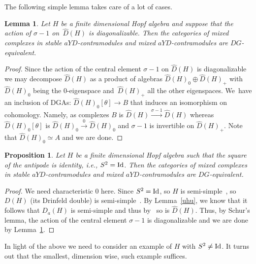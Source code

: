 \documentclass[pdftex]{sigma}
\numberwithin{equation}{section}
\newtheorem{Lemma}[Theorem]{Lemma}
\newtheorem{Proposition}[Theorem]{Proposition}
\begin{document}
The following simple lemma takes care of a lot of cases.

\begin{Lemma}\label{diag}
Let $H$ be a finite dimensional Hopf algebra and suppose that the action of $\sigma-1$ on~$\widehat{D}(H)$ is diagonalizable. Then the categories of mixed complexes in stable $aYD$-contramodules and mixed $aYD$-contramodules are $DG$-equivalent.
\end{Lemma}

\begin{proof}
Since the action of the central element $\sigma-1$ on $\widehat{D}(H)$ is diagonalizable we may decom\-pose $\widehat{D}(H)$ as a product of algebras $\widehat{D}(H)_0\oplus \widehat{D}(H)_+$ with $\widehat{D}(H)_0$ being the $0$-eigenspace and~$\widehat{D}(H)_+$ all the other eigenspaces. We~have an inclusion of DGAs: $\widehat{D}(H)_0[\theta]\to B$ that induces an isomorphism on cohomology. Namely, as complexes $B$ is $\widehat{D}(H)\stackrel{\sigma-1}{\to}\widehat{D}(H)$ whereas $\widehat{D}(H)_0[\theta]$ is $\widehat{D}(H)_0\stackrel{0}{\to}\widehat{D}(H)_0$ and $\sigma-1$ is invertible on $\widehat{D}(H)_+$. Note that $\widehat{D}(H)_0\simeq A$ and we are done.
\end{proof}

\begin{Proposition}\label{sscase}
Let $H$ be a finite dimensional Hopf algebra such that the square of the antipode is identity, i.e., $S^2={\rm Id}$. Then the categories of mixed complexes in stable $aYD$-contramodules and mixed $aYD$-contramodules are $DG$-equivalent.
\end{Proposition}

\begin{proof}We need characteristic $0$ here. Since $S^2={\rm Id}$, so $H$ is semi-simple~\cite{sqid2, sqid}, so $D(H)$ (its Drinfeld double) is semi-simple~\cite{dhss}. By Lemma~\ref{uhu}, we know that it follows that $D_a(H)$ is semi-simple and thus by~\cite{s2} so is $\widehat{D}(H)$. Thus, by Schur's lemma, the action of the central element $\sigma-1$ is diagonalizable and we are done by Lemma~\ref{diag}.
\end{proof}

In light of the above we need to consider an example of $H$ with $S^2\neq {\rm Id}$. It turns out that the smallest, dimension wise, such example suffices.
\end{document}

